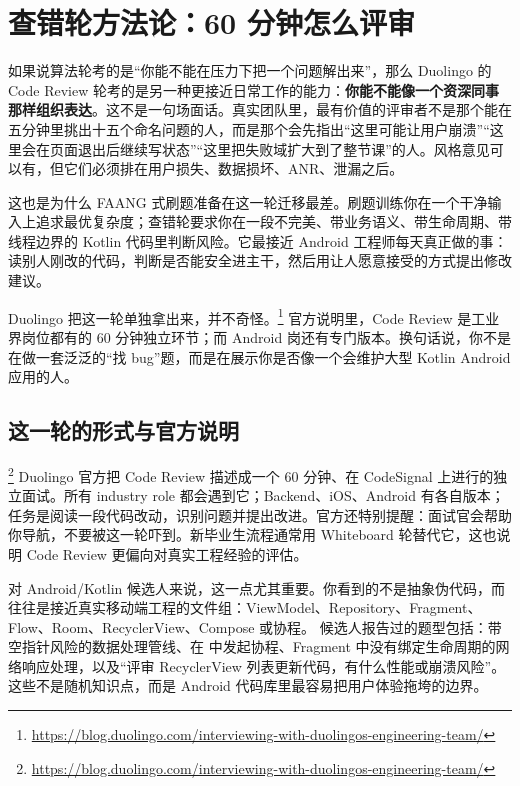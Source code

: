 \chapter{查错轮方法论：60 分钟怎么评审}

如果说算法轮考的是“你能不能在压力下把一个问题解出来”，那么 Duolingo 的 Code Review 轮考的是另一种更接近日常工作的能力：\textbf{你能不能像一个资深同事那样组织表达}。这不是一句场面话。真实团队里，最有价值的评审者不是那个能在五分钟里挑出十五个命名问题的人，而是那个会先指出“这里可能让用户崩溃”“这里会在页面退出后继续写状态”“这里把失败域扩大到了整节课”的人。风格意见可以有，但它们必须排在用户损失、数据损坏、ANR、泄漏之后。

这也是为什么 FAANG 式刷题准备在这一轮迁移最差。刷题训练你在一个干净输入上追求最优复杂度；查错轮要求你在一段不完美、带业务语义、带生命周期、带线程边界的 Kotlin 代码里判断风险。它最接近 Android 工程师每天真正做的事：读别人刚改的代码，判断是否能安全进主干，然后用让人愿意接受的方式提出修改建议。

Duolingo 把这一轮单独拿出来，并不奇怪。\srcofficial\footnote{\url{https://blog.duolingo.com/interviewing-with-duolingos-engineering-team/}} 官方说明里，Code Review 是工业界岗位都有的 60 分钟独立环节；而 Android 岗还有专门版本。换句话说，你不是在做一套泛泛的“找 bug”题，而是在展示你是否像一个会维护大型 Kotlin Android 应用的人。

\section{这一轮的形式与官方说明}

\srcofficial\footnote{\url{https://blog.duolingo.com/interviewing-with-duolingos-engineering-team/}} Duolingo 官方把 Code Review 描述成一个 60 分钟、在 CodeSignal 上进行的独立面试。所有 industry role 都会遇到它；Backend、iOS、Android 有各自版本；任务是阅读一段代码改动，识别问题并提出改进。官方还特别提醒：面试官会帮助你导航，不要被这一轮吓到。新毕业生流程通常用 Whiteboard 轮替代它，这也说明 Code Review 更偏向对真实工程经验的评估。

对 Android/Kotlin 候选人来说，这一点尤其重要。你看到的不是抽象伪代码，而往往是接近真实移动端工程的文件组：ViewModel、Repository、Fragment、Flow、Room、RecyclerView、Compose 或协程。 \srccommunity 候选人报告过的题型包括：带空指针风险的数据处理管线、在  中发起协程、Fragment 中没有绑定生命周期的网络响应处理，以及“评审 RecyclerView 列表更新代码，有什么性能或崩溃风险”。这些不是随机知识点，而是 Android 代码库里最容易把用户体验拖垮的边界。

